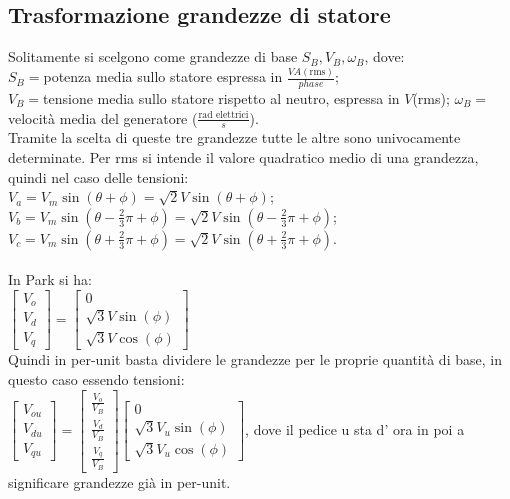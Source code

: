 \documentclass[Lau,noexaminfo]{sapthesis}
\begin{document}
	 \subsection{Trasformazione grandezze di statore}
	 Solitamente si scelgono come grandezze di base $S_B,V_B,\omega_B$, dove:\\
	 $S_B=$potenza media sullo statore espressa in $\frac{VA(\text{rms})}{phase}$;\\
	 $V_B=$tensione media sullo statore rispetto al neutro, espressa in $V$(rms);
	 $\omega_B=$velocità media del generatore ($\frac{\text{rad elettrici}}{s}$).\\
	 Tramite la scelta di queste tre grandezze tutte le altre sono univocamente determinate. Per rms si intende il valore quadratico medio di una grandezza, quindi nel caso delle tensioni:\\
	 $V_a=V_m\sin(\theta+\phi)=\sqrt{2}V\sin(\theta+\phi)$;\\
	 $V_b=V_m\sin(\theta-\frac{2}{3}\pi+\phi)=\sqrt{2}V\sin(\theta-\frac{2}{3}\pi+\phi)$;\\
	 $V_c=V_m\sin(\theta+\frac{2}{3}\pi+\phi)=\sqrt{2}V\sin(\theta+\frac{2}{3}\pi+\phi)$.\\\\
	 In Park si ha:\\
	 $\begin{bmatrix}
	 V_o\\
	 V_d\\
	 V_q
	 \end{bmatrix}=
	 \begin{bmatrix}
	 0\\
	 \sqrt{3}V\sin(\phi)\\
	 \sqrt{3}V\cos(\phi)
	 \end{bmatrix}$\\
	 Quindi in per-unit basta dividere le grandezze per le proprie quantità di base, in questo caso essendo tensioni:\\
	 $\begin{bmatrix}
	 V_{ou}\\
	 V_{du}\\
	 V_{qu}
	 \end{bmatrix}=
	 \begin{bmatrix}
	 \frac{V_{o}}{V_B}\\
	 \frac{V_{d}}{V_B}\\
	 \frac{V_{q}}{V_B}
	 \end{bmatrix}
	 \begin{bmatrix}
	 0\\
	 \sqrt{3}V_u\sin(\phi)\\
	 \sqrt{3}V_u\cos(\phi)
	 \end{bmatrix}$, dove il pedice u sta d' ora in poi a significare grandezze già in per-unit.\\\\
\end{document}
